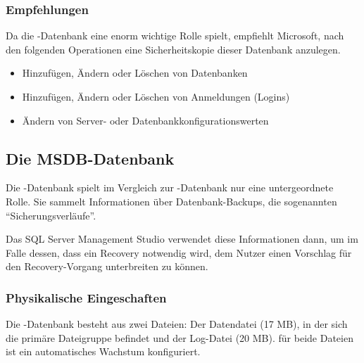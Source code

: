         \subsubsection{Empfehlungen}
          Da die -Datenbank eine enorm wichtige Rolle spielt,
          empfiehlt Microsoft, nach den folgenden Operationen eine
          Sicherheitskopie dieser Datenbank anzulegen.
          \begin{itemize}
            \item Hinzufügen, Ändern oder Löschen von Datenbanken
            \item Hinzufügen, Ändern oder Löschen von Anmeldungen (Logins)
            \item Ändern von Server- oder Datenbankkonfigurationswerten
          \end{itemize}
          \begin{literaturinternet}
            \item \cite{ms187837}
          \end{literaturinternet}
      \subsection{Die MSDB-Datenbank}
        Die -Datenbank spielt im Vergleich zur
        -Datenbank nur eine untergeordnete Rolle. Sie sammelt
        Informationen über Datenbank-Backups, die sogenannten
        \enquote{Sicherungsverläufe}.
        
        Das SQL Server Management Studio verwendet diese Informationen dann, um
        im Falle dessen, dass ein Recovery notwendig wird, dem Nutzer einen
        Vorschlag f\"ur den Recovery-Vorgang unterbreiten zu können.
        \subsubsection{Physikalische Eingeschaften}
          Die -Datenbank besteht aus zwei Dateien: Der
          Datendatei  (17 MB), in der sich die
          primäre Dateigruppe befindet und der Log-Datei
           (20 MB). f\"ur beide Dateien ist ein
          automatisches Wachstum konfiguriert.
